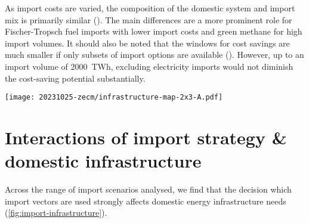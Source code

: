 
As import costs are varied, the composition of the domestic system and import
mix is primarily similar (). The main differences are a
more prominent role for Fischer-Tropsch fuel imports with lower import costs and
green methane for high import volumes. It should also be noted that the windows
for cost savings are much smaller if only subsets of import options are
available (). However, up to an import volume of
2000~TWh, excluding electricity imports would not diminish the cost-saving
potential substantially.

\begin{figure*}
    \texttt{[image: 20231025-zecm/infrastructure-map-2x3-A.pdf]}
    \caption{\textbf{Layout of European energy infrastructure for different import scenarios.}
        Left column shows the regional electricity supply mix (pies), added HVDC
        and HVAC transmission capacity (lines), and the siting of battery
        storage (choropleth). Right column shows the hydrogen supply (top half
        of pies) and consumption (bottom half of pies), net flow and direction
        of hydrogen in newly built pipelines (lines), and the siting of hydrogen
        storage subject to geological potentials (choropleth). Total volumes of
        transmission expansion are given in TWkm, which is the sum product of
        the capacity and length of individual connections. The half circle in
        the Bay of Biscay indicates the imports of carriers that are not
        spatially resolved: ammonia, steel, methanol, Fischer-Tropsch fuels.
        Hydrogen imports are shown at the entry points. Hydrogen imports in
        Bulgaria and Romania originate from Algeria and Egypt. Maps for more
        scenarios are included in the supplementary material. }
    \label{fig:import-infrastructure}
\end{figure*}

\section*{Interactions of import strategy \& domestic infrastructure}

Across the range of import scenarios analysed, we find that the decision which
import vectors are used strongly affects domestic energy infrastructure needs
(\cref{fig:import-infrastructure}).

